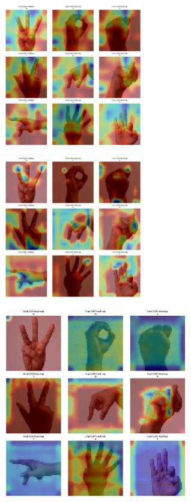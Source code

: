 \begin{multicols}{2}
\includegraphics[width=0.45\textwidth]{Assets/gradcam_heatmap/RESNET152.png}

\vspace{0.8cm}

\includegraphics[width=0.45\textwidth]{Assets/gradcam_heatmap/vgg16.png}

\vspace{0.8cm}

\end{multicols}


\renewcommand{\thefigure}{2.\arabic{figure}} %

\begin{center}
    \includegraphics[width=0.6\textwidth]{Assets/gradcam_heatmap/CONVNEXT.png}
\end{center}


